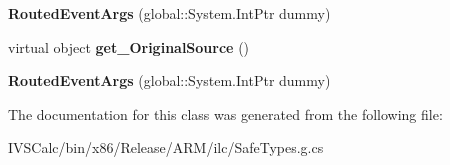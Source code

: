 \begin{DoxyCompactItemize}
{\bfseries Routed\+Event\+Args} (global\+::\+System.\+Int\+Ptr dummy)
\item 
\mbox{\label{class_windows_1_1_u_i_1_1_xaml_1_1_routed_event_args_a6eb9fce64483dfcf891c52cc354b6235}} 
virtual object {\bfseries get\+\_\+\+Original\+Source} ()
\item 
\mbox{\label{class_windows_1_1_u_i_1_1_xaml_1_1_routed_event_args_a549efc64595507441e18481b97e59988}} 
{\bfseries Routed\+Event\+Args} (global\+::\+System.\+Int\+Ptr dummy)
\end{DoxyCompactItemize}


The documentation for this class was generated from the following file\+:\begin{DoxyCompactItemize}
\item 
I\+V\+S\+Calc/bin/x86/\+Release/\+A\+R\+M/ilc/Safe\+Types.\+g.\+cs\end{DoxyCompactItemize}
